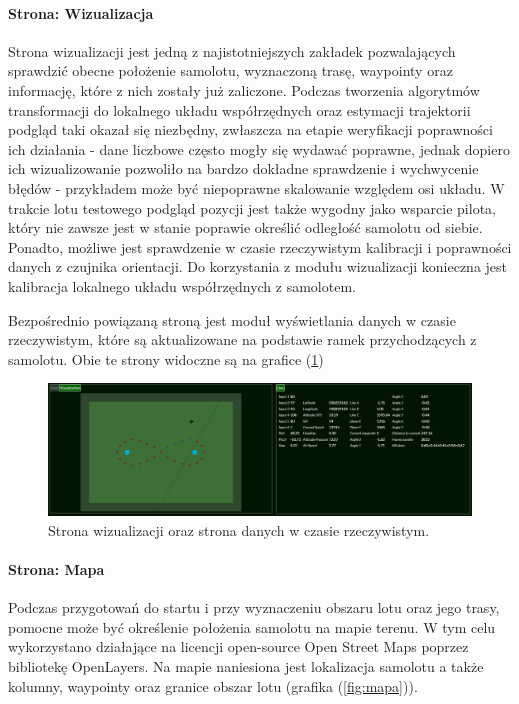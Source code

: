 \documentclass[12pt, a4paper]{article}
\let\oldref\ref
\renewcommand{\ref}[1]{(\oldref{#1})}
\begin{document}
\FloatBarrier
 
\paragraph{Strona: Wizualizacja}\mbox{}

Strona wizualizacji jest jedną z najistotniejszych zakładek pozwalających sprawdzić obecne położenie samolotu, wyznaczoną trasę, waypointy oraz informację, które z nich zostały już zaliczone. Podczas tworzenia algorytmów transformacji do lokalnego układu współrzędnych oraz estymacji trajektorii podgląd taki okazał się niezbędny, zwłaszcza na etapie weryfikacji poprawności ich działania - dane liczbowe często mogły się wydawać poprawne, jednak dopiero ich wizualizowanie pozwoliło na bardzo dokładne sprawdzenie i wychwycenie błędów - przykładem może być niepoprawne skalowanie względem osi układu. W trakcie lotu testowego podgląd pozycji jest także wygodny jako wsparcie pilota, który nie zawsze jest w stanie poprawie określić odległość samolotu od siebie. Ponadto, możliwe jest sprawdzenie w czasie rzeczywistym kalibracji i poprawności danych z czujnika orientacji. Do korzystania z modułu wizualizacji konieczna jest kalibracja lokalnego układu współrzędnych z samolotem. 

Bezpośrednio powiązaną stroną jest moduł wyświetlania danych w czasie rzeczywistym, które są aktualizowane na podstawie ramek przychodzących z samolotu. Obie te strony widoczne są na grafice \ref{fig:wizlive}

 \begin{figure}[H]
    \centering
    \includegraphics[width=1\textwidth]{wizualizacja}
    \caption{Strona wizualizacji oraz strona danych w czasie rzeczywistym.}
    \label{fig:wizlive}
\end{figure}

\paragraph{Strona: Mapa}\mbox{}

Podczas przygotowań do startu i przy wyznaczeniu obszaru lotu oraz jego trasy, pomocne może być określenie położenia samolotu na mapie terenu. W tym celu wykorzystano działające na licencji open-source Open Street Maps poprzez bibliotekę OpenLayers. Na mapie naniesiona jest lokalizacja samolotu a także kolumny, waypointy oraz granice obszar lotu (grafika \ref{fig:mapa}).
\end{document}
